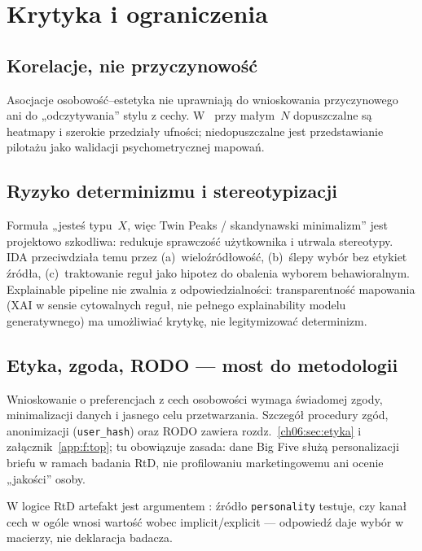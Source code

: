 \section{Krytyka i ograniczenia}
\label{ch05:sec:krytyka}

\subsection{Korelacje, nie przyczynowość}
Asocjacje osobowość--estetyka nie uprawniają do wnioskowania przyczynowego ani do „odczytywania” stylu z cechy.
W~ przy małym~$N$ dopuszczalne są heatmapy i szerokie przedziały ufności; niedopuszczalne jest przedstawianie pilotażu jako walidacji psychometrycznej mapowań.

\subsection{Ryzyko determinizmu i stereotypizacji}
Formuła „jesteś typu~$X$, więc Twin Peaks / skandynawski minimalizm” jest projektowo szkodliwa: redukuje sprawczość użytkownika i utrwala stereotypy.
IDA przeciwdziała temu przez (a)~wieloźródłowość, (b)~ślepy wybór bez etykiet źródła, (c)~traktowanie reguł jako hipotez do obalenia wyborem behawioralnym.
Explainable pipeline nie zwalnia z odpowiedzialności: transparentność mapowania (XAI w sensie cytowalnych reguł, nie pełnego explainability modelu generatywnego) ma umożliwiać krytykę, nie legitymizować determinizm.

\subsection{Etyka, zgoda, RODO --- most do metodologii}
Wnioskowanie o preferencjach z cech osobowości wymaga świadomej zgody, minimalizacji danych i jasnego celu przetwarzania.
Szczegół procedury zgód, anonimizacji (\texttt{user\_hash}) oraz RODO zawiera rozdz.~\ref{ch06:sec:etyka} i załącznik~\ref{app:f:top}; tu obowiązuje zasada: dane Big Five służą personalizacji briefu w ramach badania RtD, nie profilowaniu marketingowemu ani ocenie „jakości” osoby.

W logice RtD artefakt jest argumentem \parencite{zimmerman2007rtd}: źródło \texttt{personality} testuje, czy kanał cech w ogóle wnosi wartość wobec implicit/explicit --- odpowiedź daje wybór w macierzy, nie deklaracja badacza.

